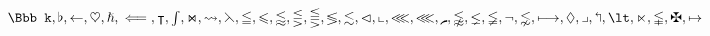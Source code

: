 $
      \Bbb k,
      \flat,
      \gets,
      \heartsuit,
      \hslash,
      \impliedby,
      \intercal,
      \intop,
      \Join,
      \leadsto,
      \leftthreetimes,
      \leqq,
      \leqslant,
      \lessapprox,
      \lesseqgtr,
      \lesseqqgtr,
      \lessgtr,
      \lesssim,
      \lhd,
      \llcorner,
      \lll,
      \llless,
      \lmoustache,
      \lnapprox,
      \lneq,
      \lneqq,
      \lnot,
      \lnsim,
      \longmapsto,
      \lozenge,
      \lrcorner,
      \Lsh,
      \lt,
      \ltimes,
      \lvertneqq,
      \maltese,
      \mapsto
$